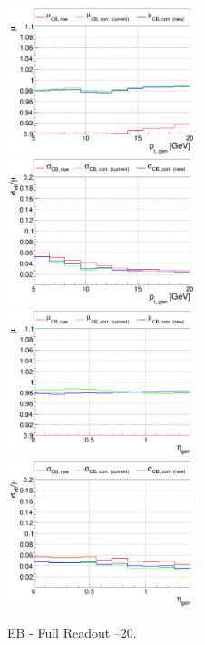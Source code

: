 \begin{figure}[thp!]
\includegraphics[width=0.495\textwidth]{./plots_pdf/ECAL_plots/plotsPU/EB/FULL/pdf/GENPT/EBFULL_GENPT_0005_0020_MuOverBins.pdf}
\includegraphics[width=0.495\textwidth]{./plots_pdf/ECAL_plots/plotsPU/EB/FULL/pdf/GENPT/EBFULL_GENPT_0005_0020_EffSigmaOverBins.pdf}
\includegraphics[width=0.495\textwidth]{./plots_pdf/ECAL_plots/plotsPU/EB/FULL/pdf/GENETA/EBFULL_GENETA_0005_0020_MuOverBins.pdf}
\includegraphics[width=0.495\textwidth]{./plots_pdf/ECAL_plots/plotsPU/EB/FULL/pdf/GENETA/EBFULL_GENETA_0005_0020_EffSigmaOverBins.pdf}
\caption{EB - Full Readout --20\GeV.}
\end{figure}


